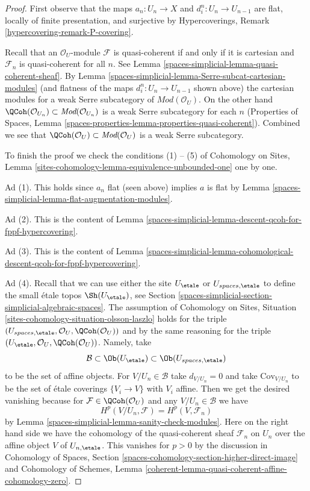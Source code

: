 \begin{proof}
First observe that the maps $a_n : U_n \to X$ and $d^n_i : U_n \to U_{n - 1}$
are flat, locally of finite presentation, and surjective by
Hypercoverings, Remark \ref{hypercovering-remark-P-covering}.

\medskip\noindent
Recall that an $\mathcal{O}_U$-module $\mathcal{F}$ is quasi-coherent if and
only if it is cartesian and $\mathcal{F}_n$ is quasi-coherent for all $n$.
See Lemma \ref{spaces-simplicial-lemma-quasi-coherent-sheaf}.
By Lemma \ref{spaces-simplicial-lemma-Serre-subcat-cartesian-modules}
(and flatness of the maps $d^n_i : U_n \to U_{n - 1}$ shown above)
the cartesian modules for a weak Serre subcategory of
$\textit{Mod}(\mathcal{O}_U)$. On the other hand
$\QCoh(\mathcal{O}_{U_n}) \subset \textit{Mod}(\mathcal{O}_{U_n})$
is a weak Serre subcategory for each $n$
(Properties of Spaces, Lemma
\ref{spaces-properties-lemma-properties-quasi-coherent}).
Combined we see that
$\QCoh(\mathcal{O}_U) \subset \textit{Mod}(\mathcal{O}_U)$
is a weak Serre subcategory.

\medskip\noindent
To finish the proof we check the conditions (1) -- (5) of
Cohomology on Sites, Lemma
\ref{sites-cohomology-lemma-equivalence-unbounded-one} one by one.

\medskip\noindent
Ad (1). This holds since $a_n$ flat (seen above) implies $a$ is flat
by Lemma \ref{spaces-simplicial-lemma-flat-augmentation-modules}.

\medskip\noindent
Ad (2). This is the content of
Lemma \ref{spaces-simplicial-lemma-descent-qcoh-for-fppf-hypercovering}.

\medskip\noindent
Ad (3). This is the content of
Lemma \ref{spaces-simplicial-lemma-cohomological-descent-qcoh-for-fppf-hypercovering}.

\medskip\noindent
Ad (4). Recall that we can use either the site $U_\etale$ or
$U_{spaces, \etale}$ to define the small \'etale topos
$\Sh(U_\etale)$, see Section \ref{spaces-simplicial-section-simplicial-algebraic-spaces}.
The assumption of
Cohomology on Sites, Situation \ref{sites-cohomology-situation-olsson-laszlo}
holds for the triple
$(U_{spaces, \etale}, \mathcal{O}_U, \QCoh(\mathcal{O}_U))$
and by the same reasoning for the triple
$(U_\etale, \mathcal{O}_U, \QCoh(\mathcal{O}_U))$.
Namely, take
$$
\mathcal{B} \subset \Ob(U_\etale) \subset \Ob(U_{spaces, \etale})
$$
to be the set of affine objects. For $V/U_n \in \mathcal{B}$
take $d_{V/U_n} = 0$ and take $\text{Cov}_{V/U_n}$ to be the set of
\'etale coverings $\{V_i \to V\}$ with $V_i$ affine.
Then we get the desired vanishing because for
$\mathcal{F} \in \QCoh(\mathcal{O}_U)$
and any $V/U_n \in \mathcal{B}$ we have
$$
H^p(V/U_n, \mathcal{F}) = H^p(V, \mathcal{F}_n)
$$
by Lemma \ref{spaces-simplicial-lemma-sanity-check-modules}. Here on the
right hand side we have the cohomology of the quasi-coherent
sheaf $\mathcal{F}_n$ on $U_n$ over the affine object $V$
of $U_{n, \etale}$. This vanishes for $p > 0$ by the discussion in
Cohomology of Spaces, Section
\ref{spaces-cohomology-section-higher-direct-image} and
Cohomology of Schemes, Lemma
\ref{coherent-lemma-quasi-coherent-affine-cohomology-zero}.


\end{proof}
